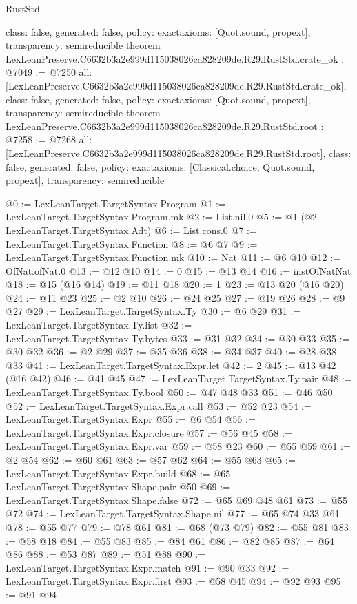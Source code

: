 \begin{lexlean}{RustStd}
\begin{coremodule}
{  class: false,
  generated: false,
  policy: exact{axioms: [Quot.sound, propext]},
  transparency: semireducible
}
theorem LexLeanPreserve.C6632b3a2e999d115038026ca828209de.R29.RustStd.crate_ok : @7049 := @7250 {
  all: [LexLeanPreserve.C6632b3a2e999d115038026ca828209de.R29.RustStd.crate_ok],
  class: false,
  generated: false,
  policy: exact{axioms: [Quot.sound, propext]},
  transparency: semireducible
}
theorem LexLeanPreserve.C6632b3a2e999d115038026ca828209de.R29.RustStd.root : @7258 := @7268 {
  all: [LexLeanPreserve.C6632b3a2e999d115038026ca828209de.R29.RustStd.root],
  class: false,
  generated: false,
  policy: exact{axioms: [Classical.choice, Quot.sound, propext]},
  transparency: semireducible
}

@0 := LexLeanTarget.TargetSyntax.Program
@1 := LexLeanTarget.TargetSyntax.Program.mk
@2 := List.nil.{0}
@5 := @1 (@2 LexLeanTarget.TargetSyntax.Adt)
@6 := List.cons.{0}
@7 := LexLeanTarget.TargetSyntax.Function
@8 := @6 @7
@9 := LexLeanTarget.TargetSyntax.Function.mk
@10 := Nat
@11 := @6 @10
@12 := OfNat.ofNat.{0}
@13 := @12 @10
@14 := 0
@15 := @13 @14
@16 := instOfNatNat
@18 := @15 (@16 @14)
@19 := @11 @18
@20 := 1
@23 := @13 @20 (@16 @20)
@24 := @11 @23
@25 := @2 @10
@26 := @24 @25
@27 := @19 @26
@28 := @9 @27
@29 := LexLeanTarget.TargetSyntax.Ty
@30 := @6 @29
@31 := LexLeanTarget.TargetSyntax.Ty.list
@32 := LexLeanTarget.TargetSyntax.Ty.bytes
@33 := @31 @32
@34 := @30 @33
@35 := @30 @32
@36 := @2 @29
@37 := @35 @36
@38 := @34 @37
@40 := @28 @38 @33
@41 := LexLeanTarget.TargetSyntax.Expr.let
@42 := 2
@45 := @13 @42 (@16 @42)
@46 := @41 @45
@47 := LexLeanTarget.TargetSyntax.Ty.pair
@48 := LexLeanTarget.TargetSyntax.Ty.bool
@50 := @47 @48 @33
@51 := @46 @50
@52 := LexLeanTarget.TargetSyntax.Expr.call
@53 := @52 @23
@54 := LexLeanTarget.TargetSyntax.Expr
@55 := @6 @54
@56 := LexLeanTarget.TargetSyntax.Expr.closure
@57 := @56 @45
@58 := LexLeanTarget.TargetSyntax.Expr.var
@59 := @58 @23
@60 := @55 @59
@61 := @2 @54
@62 := @60 @61
@63 := @57 @62
@64 := @55 @63
@65 := LexLeanTarget.TargetSyntax.Expr.build
@68 := @65 LexLeanTarget.TargetSyntax.Shape.pair @50
@69 := LexLeanTarget.TargetSyntax.Shape.false
@72 := @65 @69 @48 @61
@73 := @55 @72
@74 := LexLeanTarget.TargetSyntax.Shape.nil
@77 := @65 @74 @33 @61
@78 := @55 @77
@79 := @78 @61
@81 := @68 (@73 @79)
@82 := @55 @81
@83 := @58 @18
@84 := @55 @83
@85 := @84 @61
@86 := @82 @85
@87 := @64 @86
@88 := @53 @87
@89 := @51 @88
@90 := LexLeanTarget.TargetSyntax.Expr.match
@91 := @90 @33
@92 := LexLeanTarget.TargetSyntax.Expr.first
@93 := @58 @45
@94 := @92 @93
@95 := @91 @94

\end{coremodule}
\end{lexlean}
